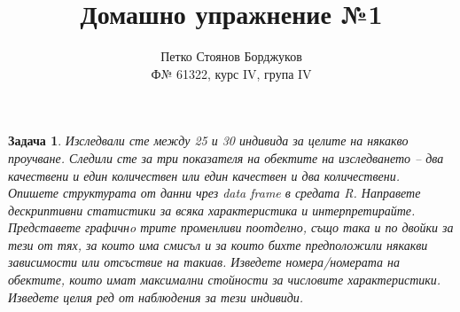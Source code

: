 \documentclass[draft,12pt]{report}
\newtheorem{pr}{Задача}
\begin{document}
\title{Домашно упражнение №1}
\author{Петко Стоянов Борджуков\\\small{Ф№ 61322, курс IV, група IV}}

\maketitle

\begin{pr}
Изследвали сте между 25 и 30 индивида за целите на някакво проучване. Следили
сте за три показателя на обектите на изследването -- два качествени и един
количествен или един качествен и два количествени. Опишете структурата от данни
чрез data frame в средата R. Направете дескриптивни статистики за всяка
характеристика и интерпретирайте. Представете графичнo трите променливи
поотделно, също така и по двойки за тези от тях, за които има смисъл и за които
бихте предположили някакви зависимости или отсъствие на такиав. Изведете
номера/номерата на обектите, които имат максимални стойности за числовите
характеристики. Изведете целия ред от наблюдения за тези индивиди.
\end{pr}
\end{document}
